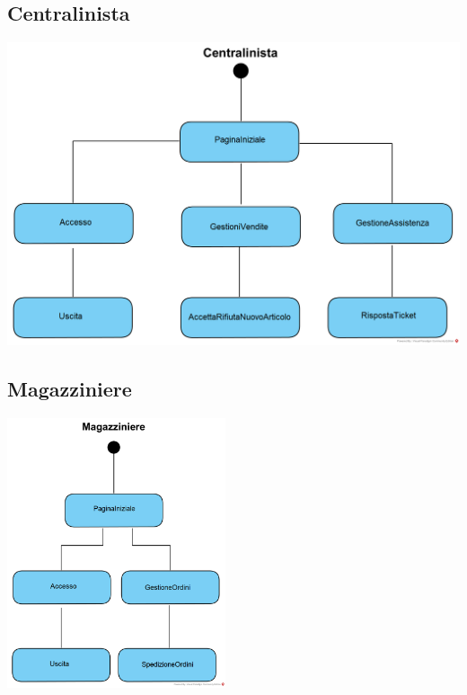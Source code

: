 \documentclass[12pt]{article}
\begin{document}
\subsection{Centralinista}
\begin{center}
\includegraphics[width=\textwidth]{NavigationalPath/Centralinista}
\end{center}

\subsection{Magazziniere}
\begin{center}
\includegraphics[height=300px]{NavigationalPath/Magazziniere}
\end{center}
\end{document}
